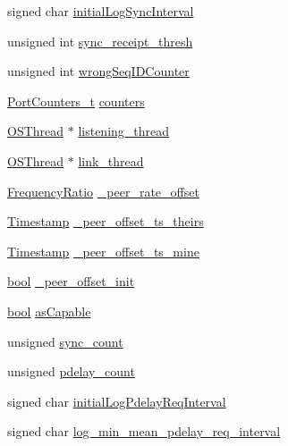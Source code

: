 \begin{DoxyCompactItemize}
\item 
signed char \hyperlink{class_common_port_af64dc42272c346cc5f6f400c0e7d7088}{initial\+Log\+Sync\+Interval}
\item 
unsigned int \hyperlink{class_common_port_a232479ab941f1d5473e3bd8cb4831e6c}{sync\+\_\+receipt\+\_\+thresh}
\item 
unsigned int \hyperlink{class_common_port_abd149bb94f90455cf47e7223a892772a}{wrong\+Seq\+I\+D\+Counter}
\item 
\hyperlink{struct_port_counters__t}{Port\+Counters\+\_\+t} \hyperlink{class_common_port_aa7b0659a6104355b95878f69b0aefb69}{counters}
\item 
\hyperlink{class_o_s_thread}{O\+S\+Thread} $\ast$ \hyperlink{class_common_port_a8d14866e935b3dd25fd2bc6593f41ca5}{listening\+\_\+thread}
\item 
\hyperlink{class_o_s_thread}{O\+S\+Thread} $\ast$ \hyperlink{class_common_port_a6c20b9b679b91a3c182699d6d001377a}{link\+\_\+thread}
\item 
\hyperlink{ptptypes_8hpp_a84de47dc2ed889ecd2b61706d3ad0f2e}{Frequency\+Ratio} \hyperlink{class_common_port_a43c379422577226fdb4f3d0992c3bcea}{\+\_\+peer\+\_\+rate\+\_\+offset}
\item 
\hyperlink{class_timestamp}{Timestamp} \hyperlink{class_common_port_a1f6041bf2ebd6caa6904588b5025102c}{\+\_\+peer\+\_\+offset\+\_\+ts\+\_\+theirs}
\item 
\hyperlink{class_timestamp}{Timestamp} \hyperlink{class_common_port_aeba21fee916aba7bfc8d39fd25e4a9e0}{\+\_\+peer\+\_\+offset\+\_\+ts\+\_\+mine}
\item 
\hyperlink{avb__gptp_8h_af6a258d8f3ee5206d682d799316314b1}{bool} \hyperlink{class_common_port_af8c00562f3646d6e72ae511b7ccf3df2}{\+\_\+peer\+\_\+offset\+\_\+init}
\item 
\hyperlink{avb__gptp_8h_af6a258d8f3ee5206d682d799316314b1}{bool} \hyperlink{class_common_port_a15a09cf240fb37b905e4d4e1e9f5b9a1}{as\+Capable}
\item 
unsigned \hyperlink{class_common_port_aa132d04156a99209578443a259a2435c}{sync\+\_\+count}
\item 
unsigned \hyperlink{class_common_port_ae5740de9215d7749a564669d22ba1245}{pdelay\+\_\+count}
\item 
signed char \hyperlink{class_common_port_a7595d62409f4880035eb20c62b64ea7c}{initial\+Log\+Pdelay\+Req\+Interval}
\item 
signed char \hyperlink{class_common_port_aed81f7b57d71924797a6ffa400455feb}{log\+\_\+min\+\_\+mean\+\_\+pdelay\+\_\+req\+\_\+interval}

\end{DoxyCompactItemize}
